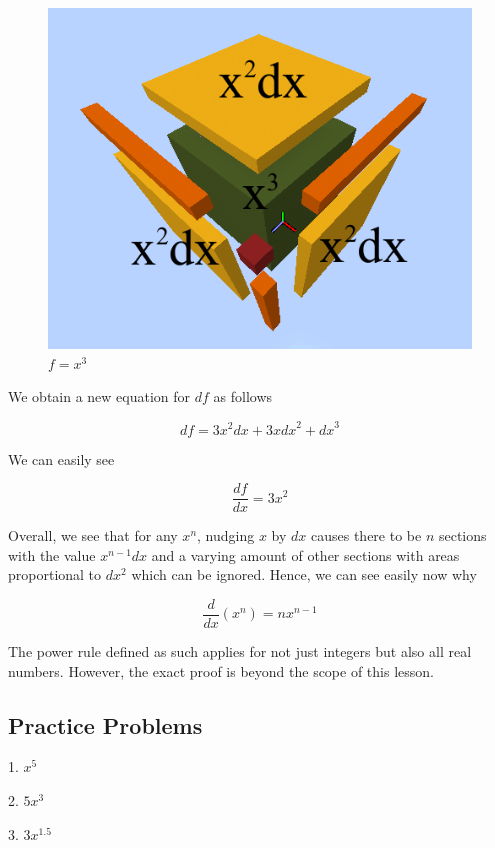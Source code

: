 \documentclass[a4paper,12pt,oneside]{book}
\begin{document}
\begin{figure}[H]
    \begin{center}
        \includegraphics[scale=0.75]{img/zayan/pr2.png}
        \caption{$f=x^3$}
        \label{fig:pr2}
    \end{center}
\end{figure}

\noindent We obtain a new equation for $df$ as follows

$$df = 3x^2dx+3x{dx}^2+{dx}^3$$

\noindent We can easily see

$$\frac{df}{dx}=3x^2$$

\noindent Overall, we see that for any $x^n$, nudging $x$ by $dx$ causes there to be $n$ sections with the value $x^{n-1}dx$ and a varying amount of other sections with areas proportional to $dx^2$ which can be ignored. Hence, we can see easily now why

$$\frac{d}{dx}(x^n)=nx^{n-1}$$

\noindent The power rule defined as such applies for not just integers but also all real numbers. However, the exact proof is beyond the scope of this lesson.

\subsection{Practice Problems}

1. $x^5$

2. $5x^3$

3. $3x^1.5$
\end{document}
